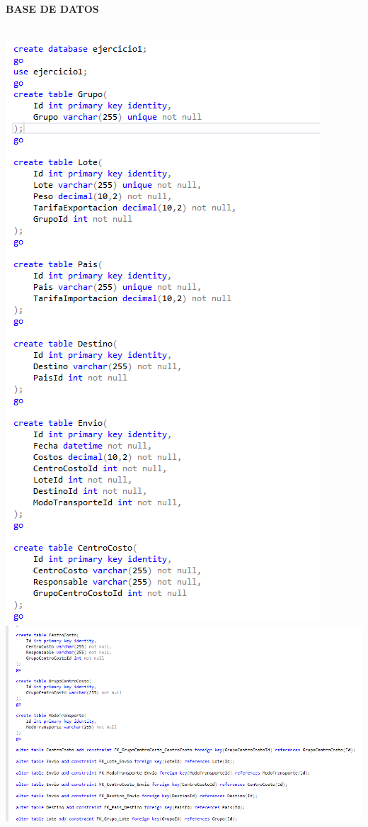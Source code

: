 \documentclass[12pt,letterpaper]{article}
\begin{document}
\newpage
\textbf{BASE DE DATOS}\\\\
\begin{center} 
\includegraphics[scale=0.80]{imagenes/a1.png}\\
\includegraphics[width=14cm]{imagenes/a2.png}
\end{center} 
\end{document}
